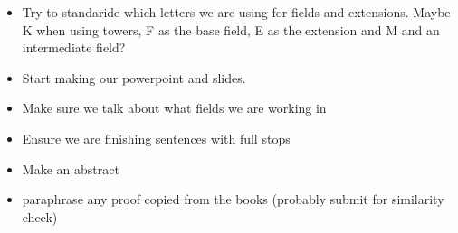 \begin{itemize}
    \item Try to standaride which letters we are using for fields and extensions. Maybe K when using towers, F as the base field, E as the extension and M and an intermediate field?
    \item Start making our powerpoint and slides.
    \item Make sure we talk about what fields we are working in
    \item Ensure we are finishing sentences with full stops
    \item Make an abstract
    \item paraphrase any proof copied from the books (probably submit for similarity check)
\end{itemize}
